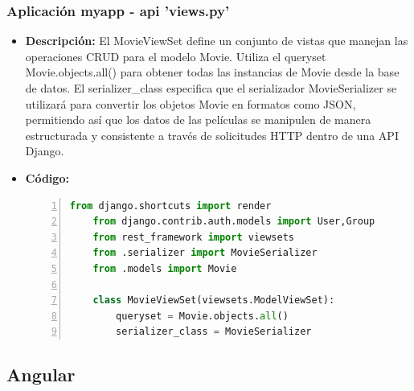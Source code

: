 \documentclass{article}
\begin{document}
  \subsubsection{Aplicación myapp - api 'views.py'}
  \begin{itemize}
    \item \textbf{Descripción: }El MovieViewSet define un conjunto de vistas que manejan las 
    operaciones CRUD para el modelo Movie. Utiliza el queryset Movie.objects.all() para obtener 
    todas las instancias de Movie desde la base de datos. El serializer\_class especifica que el 
    serializador MovieSerializer se utilizará para convertir los objetos Movie en formatos como 
    JSON, permitiendo así que los datos de las películas se manipulen de manera estructurada y 
    consistente a través de solicitudes HTTP dentro de una API Django.
    \item \textbf{Código: }
    \begin{lstlisting}[language=python, numbers=left, firstnumber=1, numberstyle=\color{blue}]
    from django.shortcuts import render
    from django.contrib.auth.models import User,Group
    from rest_framework import viewsets
    from .serializer import MovieSerializer
    from .models import Movie

    class MovieViewSet(viewsets.ModelViewSet):
        queryset = Movie.objects.all()
        serializer_class = MovieSerializer
    \end{lstlisting}
  \end{itemize}
  
  \subsection{Angular}
\end{document}
